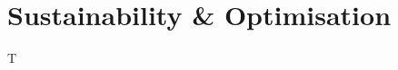 \documentclass[11pt]{article}
\begin{document}
\section{Sustainability & Optimisation}

T








































%
%
%
\end{document}
